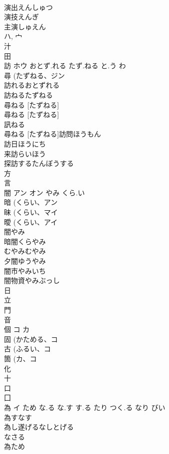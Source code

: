 \documentclass[8pt]{extreport}
\begin{document}
\begin{CJK}{UTF8}{min}
\\	演出えんしゅつ
\\	演技えんぎ
\\	主演しゅえん
\\	ハ, 宀 
\\	汁 
\\	田 
\\	訪	ホウ	おとず.れる たず.ねる と.う わ	
\\	尋 (たずねる、ジン 
\\	訪れるおとずれる
\\	訪ねるたずねる
\\	尋ねる [たずねる]
\\	尋ねる [たずねる]
\\	訊ねる 
\\	尋ねる [たずねる]訪問ほうもん
\\	訪日ほうにち
\\	来訪らいほう
\\	探訪するたんぼうする
\\	方 
\\	言 
\\	闇	アン オン	やみ くら.い	
\\	暗 (くらい、アン 
\\	昧 (くらい、マイ 
\\	曖 (くらい、アイ 
\\	闇やみ
\\	暗闇くらやみ
\\	むやみむやみ
\\	夕闇ゆうやみ
\\	闇市やみいち
\\	闇物資やみぶっし
\\	日 
\\	立 
\\	門 
\\	音 
\\	個	コ カ		
\\	固 (かためる、コ 
\\	古 (ふるい、コ 
\\	箇 (カ、コ 
\\	化 
\\	十 
\\	口 
\\	囗 
\\	為	イ	ため な.る な.す す.る たり つく.る なり びい	
\\	為すなす 
\\	為し遂げるなしとげる 
\\	なさる 
\\	為ため 

\end{CJK}
\end{document}
